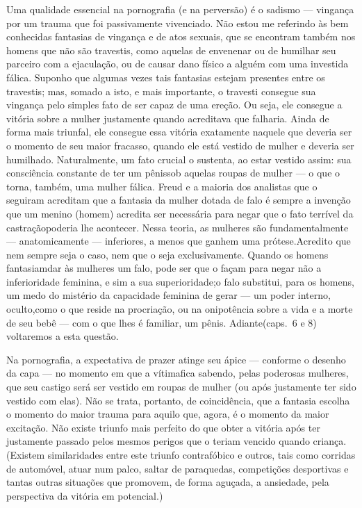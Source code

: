 Uma qualidade essencial na pornografia (e na perversão) é o\idxsadiporn{} sadismo\idxpornosadi{}
--- vingança por um trauma que foi passivamente vivenciado. Não estou
me referindo às bem conhecidas fantasias de vingança e de atos sexuais,
que se encontram também nos homens que não são travestis, como aquelas
de envenenar ou de humilhar seu parceiro com a ejaculação, ou de causar
dano físico a alguém com uma investida fálica. Suponho que algumas
vezes tais fantasias estejam presentes entre os travestis; mas, somado
a isto, e mais importante, o travesti consegue sua vingança pelo
simples fato de ser capaz de uma ereção. Ou seja, ele consegue a
vitória sobre a mulher justamente quando acreditava que falharia. Ainda
de forma mais triunfal, ele consegue essa vitória exatamente naquele
que deveria ser o momento de seu maior fracasso, quando ele está
vestido de mulher e deveria ser humilhado. Naturalmente, um fato
crucial o sustenta, ao estar vestido assim: sua consciência constante
de ter um pênis\idxpenisfant[|(] sob aquelas roupas de mulher --- o que o torna,
também, uma mulher fálica.\idxcastamulh{} Freud\idxfreudmulhe{} e a maioria dos analistas que o
seguiram acreditam que a fantasia da mulher dotada de falo é sempre a
invenção que um menino (homem) acredita ser necessária para negar que o
fato terrível da castração\idxcastatrav[|)] poderia lhe acontecer. Nessa teoria, as
mulheres são fundamentalmente --- anatomicamente --- inferiores, a
menos que ganhem uma prótese.\idxtravemangu[|)] Acredito que nem sempre seja o caso, nem
que o seja exclusivamente. Quando os homens fantasiam\idxtravemfant[|(] dar às mulheres
um falo, pode ser que o façam para negar não a inferioridade feminina,
e sim a sua superioridade;\idxtravemmasc[|(] o falo substitui, para os homens, um medo do
mistério da capacidade feminina de gerar --- um poder interno, oculto,\idxtravemving[|)]
como o que reside na procriação,\idxcondfcapa{} ou na onipotência sobre a vida e a
morte de seu bebê --- com o que lhes é familiar, um pênis. Adiante\idxvingatra[|)]
(caps.~6 e 8) voltaremos a esta questão.

Na pornografia, a expectativa de prazer atinge seu ápice ---
conforme o desenho da capa --- no momento em que a vítima\idxpornoviti[|(] fica
sabendo, pelas poderosas mulheres, que seu castigo será ser vestido em
roupas de mulher (ou após justamente ter sido vestido com elas). Não se
trata, portanto, de coincidência, que a fantasia escolha o momento do
maior trauma para aquilo que, agora, é o momento da maior excitação.
Não existe triunfo mais perfeito do que obter a vitória após ter
justamente passado pelos\idxperigo{} mesmos perigos\idxpervexpos{} que o teriam vencido quando
criança. (Existem similaridades entre este triunfo contrafóbico e
outros, tais como corridas de automóvel, atuar num palco, saltar de
paraquedas, competições desportivas e tantas outras situações que
promovem, de forma aguçada, a ansiedade, pela perspectiva da vitória em
potencial.)

